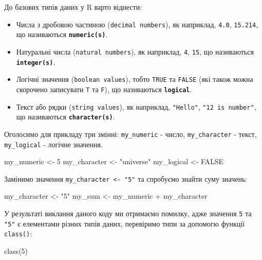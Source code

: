 \documentclass[
]{book}
\newenvironment{Shaded}{\begin{snugshade}}{\end{snugshade}}
\newcommand{\ConstantTok}[1]{\textcolor[rgb]{0.00,0.00,0.00}{#1}}
\newcommand{\DecValTok}[1]{\textcolor[rgb]{0.00,0.00,0.81}{#1}}
\newcommand{\FunctionTok}[1]{\textcolor[rgb]{0.00,0.00,0.00}{#1}}
\newcommand{\NormalTok}[1]{#1}
\newcommand{\OtherTok}[1]{\textcolor[rgb]{0.56,0.35,0.01}{#1}}
\newcommand{\SpecialCharTok}[1]{\textcolor[rgb]{0.00,0.00,0.00}{#1}}
\newcommand{\StringTok}[1]{\textcolor[rgb]{0.31,0.60,0.02}{#1}}
\providecommand{\tightlist}{%
  \setlength{\itemsep}{0pt}\setlength{\parskip}{0pt}}
\begin{document}
До базових типів даних у R варто віднести:

\begin{itemize}
\tightlist
\item
  Числа з дробовою частиною (\texttt{decimal\ numbers}), як наприклад, \texttt{4.0}, \texttt{15.214}, що називаються \textbf{\texttt{numeric(s)}}.
\item
  Натуральні числа (\texttt{natural\ numbers}), як наприклад, \texttt{4}, \texttt{15}, що називаються \textbf{\texttt{integer(s)}}.
\item
  Логічні значення (\texttt{boolean\ values}), тобто \texttt{TRUE} та \texttt{FALSE} (які також можна скорочено записувати \texttt{T} та \texttt{F}), що називаються \textbf{\texttt{logical}}.
\item
  Текст або рядки (\texttt{string\ values}), як наприклад, \texttt{"Hello"}, \texttt{"12\ is\ number"}, що називаються \textbf{\texttt{character(s)}}.
\end{itemize}

Оголосимо для прикладу три змінні: \texttt{my\_numeric} - число, \texttt{my\_character} - текст, \texttt{my\_logical} - логічне значення.

\begin{Shaded}
\begin{Highlighting}[]
\NormalTok{my\_numeric }\OtherTok{\textless{}{-}} \DecValTok{5}
\NormalTok{my\_character }\OtherTok{\textless{}{-}} \StringTok{"universe"}
\NormalTok{my\_logical }\OtherTok{\textless{}{-}} \ConstantTok{FALSE}
\end{Highlighting}
\end{Shaded}

Замінимо значення \texttt{my\_character\ \textless{}-\ "5"} та спробуємо знайти суму значень:

\begin{Shaded}
\begin{Highlighting}[]
\NormalTok{my\_character }\OtherTok{\textless{}{-}} \StringTok{"5"}
\NormalTok{my\_sum }\OtherTok{\textless{}{-}}\NormalTok{ my\_numeric }\SpecialCharTok{+}\NormalTok{ my\_character}
\end{Highlighting}
\end{Shaded}

У результаті виклання даного коду ми отримаємо помилку, адже значення \texttt{5} та \texttt{"5"} є елементами різних типів даних, перевіримо типи за допомогю функції \texttt{class()}:

\begin{Shaded}
\begin{Highlighting}[]
\FunctionTok{class}\NormalTok{(}\DecValTok{5}\NormalTok{)}
\end{Highlighting}
\end{Shaded}
\end{document}
